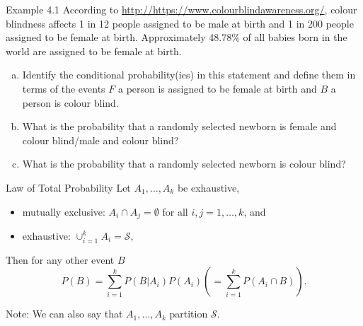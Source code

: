 \documentclass[aspectratio=169,xcolor=pdftex,dvipsnames,table]{beamer}\usepackage[]{graphicx}\usepackage[]{xcolor}
\begin{document}
\begin{frame}
  \begin{block}{Example 4.1}
    According to \url{http://https://www.colourblindawareness.org/}, colour blindness affects 1 in 12 people assigned to be male at birth and 1 in 200 people assigned to be female at birth. Approximately 48.78\% of all babies born in the world are assigned to be female at birth.

    \begin{enumerate}[a)]
      
    \item Identify the conditional probability(ies) in this statement and define them in terms of the events $F$ a person is assigned to be female at birth and $B$ a person is colour blind.
      
    \item What is the probability that a randomly selected newborn is female and colour blind/male and colour blind?
    
    \item What is the probability that a randomly selected newborn is colour blind?
      
    \end{enumerate}
  \end{block}
\end{frame}


\begin{frame}{Law of Total Probability}
  Let $A_1,\ldots,A_k$ be exhaustive,
  \begin{itemize}
  \item mutually exclusive: $A_i \cap A_j=\emptyset$ for all $i,j=1,\ldots,k$, and
  \item exhaustive: $\cup_{i=1}^k A_i = \mathcal S$,
  \end{itemize}
  Then for any other event $B$
  \[
    P(B)=\sum_{i=1}^k P(B|A_i)P(A_i)\left(=\sum_{i=1}^k P(A_i \cap B)\right).
  \]
  
  \medskip
  
  Note: We can also say that $A_1,\ldots,A_k$ partition $\mathcal S$.

\end{frame}
\end{document}
